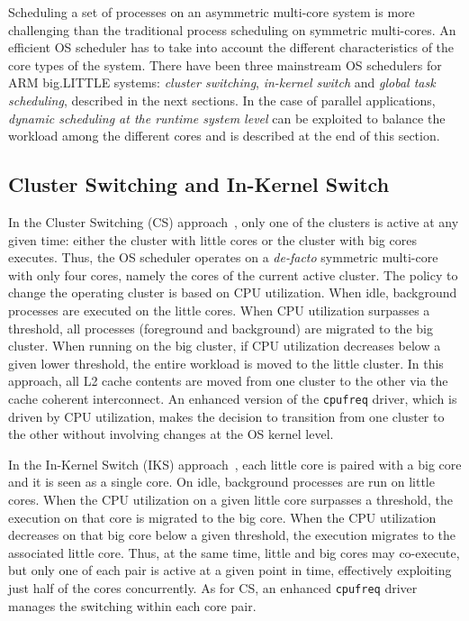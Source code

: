 Scheduling a set of processes on an asymmetric multi-core system is more challenging than the traditional process scheduling on symmetric multi-cores. 
An efficient OS scheduler has to take into account the different characteristics of the core types of the system.
There have been three mainstream OS schedulers for ARM big.LITTLE systems: \textit{cluster switching}, 
\textit{in-kernel switch} and \textit{global task scheduling}, described in the next sections.
In the case of parallel applications, \textit{dynamic scheduling at the runtime system level} can be exploited to balance the workload among the different cores and is described at the end of this section.


\subsection{Cluster Switching and In-Kernel Switch}
In the Cluster Switching (CS) approach~\cite{samsung}, only one of the clusters is active at any given time: either the cluster with little cores or the cluster with big cores executes. Thus, the OS scheduler operates on a \emph{de-facto} symmetric multi-core with only four cores, namely the cores of the current active cluster. The policy to change the operating cluster is based on CPU utilization. When idle, background processes are executed on the little cores. When CPU utilization surpasses a threshold, all processes (foreground and background) are migrated to the big cluster. When running on the big cluster, if CPU utilization decreases below a given lower threshold, the entire workload is moved to the little cluster. In this approach, all L2 cache contents are moved from one cluster to the other via the cache coherent interconnect.
An enhanced version of the \texttt{cpufreq} driver, which is driven by CPU utilization, makes the decision to transition from one cluster to the other without involving changes at the OS kernel level.

In the In-Kernel Switch (IKS) approach~\cite{IKS}, each little core is paired with a big core and it is seen as a single core. On idle, background processes are run on little cores. When the CPU utilization on a given little core surpasses a threshold, the execution on that core is migrated to the big core. When the CPU utilization decreases on that big core below a given threshold, the execution migrates to the associated little core. Thus, at the same time, little and big cores may co-execute, but only one of each pair is active at a given point in time, effectively exploiting just half of the cores concurrently. As for CS, an enhanced \texttt{cpufreq} driver manages the switching within each core pair.

